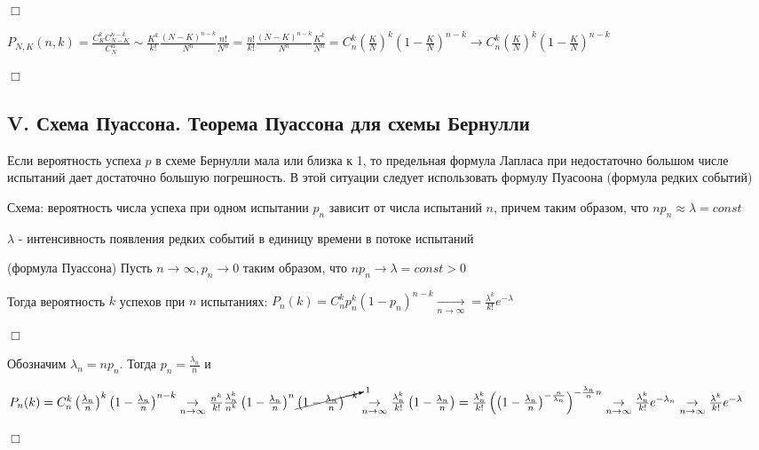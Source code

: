 \documentclass[12pt]{article}
\begin{document}
    \begin{MyProof}
        $\Box$

        $P_{N,K} (n, k) = \frac{C^k_K C_{N - K}^{n - k}}{C^n_N} \sim \frac{K^k}{k!} \frac{(N - K)^{n - k}}{N^n} \frac{n!}{N^n} =
        \frac{n!}{k!} \frac{(N - K)^{n - k}}{N^n} \frac{K^k}{N^n} = C^k_n \left(\frac{K}{N}\right)^k \left(1 - \frac{K}{N}\right)^{n - k} \to C^k_n \left(\frac{K}{N}\right)^k \left(1 - \frac{K}{N}\right)^{n - k} $

        $\Box$
    \end{MyProof}

    \subsection{V. Схема Пуассона. Теорема Пуассона для схемы Бернулли}

    \Nota Если вероятность успеха $p$ в схеме Бернулли мала или близка к 1, то предельная формула Лапласа при недостаточно большом
    числе испытаний дает достаточно большую погрешность. В этой ситуации следует использовать формулу Пуасоона (формула редких событий)

    Схема: вероятность числа успеха при одном испытании $p_n$ зависит от числа испытаний $n$, причем таким образом, что $n p_n \approx \lambda = const$

    $\lambda$ - интенсивность появления редких событий в единицу времени в потоке испытаний

    \begin{MyTheorem}
         (формула Пуассона) Пусть $n \to \infty, p_n \to 0$ таким образом, что $n p_n \to \lambda = const > 0$

        Тогда вероятность $k$ успехов при $n$ испытаниях: $P_n(k) = C^k_n p_n^k (1 - p_n)^{n - k} \underset{n \to \infty}{\rightarrow} = \frac{\lambda^k}{k!} e^{-\lambda}$
    \end{MyTheorem}

    \begin{MyProof}
        $\Box$

        Обозначим $\lambda_n = n p_n$. Тогда $p_n = \frac{\lambda_n}{n}$ и

        $P_n(k) = C^k_n \left(\frac{\lambda_n}{n}\right)^k \left(1 - \frac{\lambda_n}{n}\right)^{n - k} \underset{n \to \infty}{\rightarrow} \frac{n^k}{k!} \frac{\lambda^k_n}{n^k} \left(1 - \frac{\lambda_n}{n}\right)^n \cancelto{1}{\left(1 - \frac{\lambda_n}{n}\right)^{-k}}
        \underset{n \to \infty}{\rightarrow} \frac{\lambda_n^k}{k!} \left(1 - \frac{\lambda_n}{n}\right) = \frac{\lambda_n^k}{k!} \left(\left(1 - \frac{\lambda_n}{n}\right)^{-\frac{n}{\lambda_n}}\right)^{-\frac{\lambda_n}{n}n} \underset{n \to \infty}{\rightarrow} \frac{\lambda_n^k}{k!} e^{-\lambda_n} \underset{n \to \infty}{\rightarrow} \frac{\lambda^k}{k!} e^{-\lambda}$

        $\Box$
    \end{MyProof}
\end{document}
